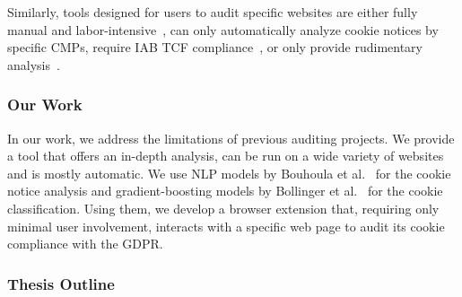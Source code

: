 Similarly, tools designed for users to audit specific websites are either fully manual and labor-intensive~\cite{gorin2024edpb}, can only automatically analyze cookie notices by specific CMPs, require IAB TCF compliance~\cite{matte2020cookiebannersrespectchoice}, or only provide rudimentary analysis~\cite{cookie_information2019cookie}.

\subsubsection{Our Work}
In our work, we address the limitations of previous auditing projects.
We provide a tool that offers an in-depth analysis, can be run on a wide variety of websites and is mostly automatic.
We use NLP models by Bouhoula et al.~\cite{bouhoula2023automated} for the cookie notice analysis and gradient-boosting models by Bollinger et al.~\cite{bollinger2022automating} for the cookie classification.
Using them, we develop a browser extension that, requiring only minimal user involvement, interacts with a specific web page to audit its cookie compliance with the GDPR.

\subsubsection{Thesis Outline}